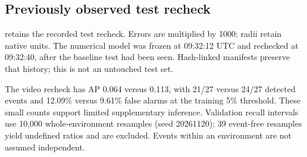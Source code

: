 \subsection*{Previously observed test recheck}
\label{sec:test_recheck}
 retains the recorded test recheck. Errors are multiplied by 1000; radii retain native units. The numerical model was frozen at 09:32:12 UTC and rechecked at 09:32:40, after the baseline test had been seen. Hash-linked manifests preserve that history; this is not an untouched test set.


The video recheck has AP 0.064 versus 0.113, with 21/27 versus 24/27 detected events and 12.09\% versus 9.61\% false alarms at the training 5\% threshold. These small counts support limited supplementary inference. Validation recall intervals use 10,000 whole-environment resamples (seed 20261120); 39 event-free resamples yield undefined ratios and are excluded. Events within an environment are not assumed independent.

